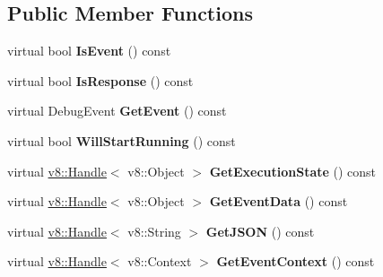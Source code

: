 \subsection*{Public Member Functions}
\begin{DoxyCompactItemize}
\item 
\hypertarget{classv8_1_1internal_1_1_message_impl_abea1e06c7076154a2d84570950d3ee5d}{}virtual bool {\bfseries Is\+Event} () const \label{classv8_1_1internal_1_1_message_impl_abea1e06c7076154a2d84570950d3ee5d}

\item 
\hypertarget{classv8_1_1internal_1_1_message_impl_ad238ccdcd5b57f7ae8a9d606bece6019}{}virtual bool {\bfseries Is\+Response} () const \label{classv8_1_1internal_1_1_message_impl_ad238ccdcd5b57f7ae8a9d606bece6019}

\item 
\hypertarget{classv8_1_1internal_1_1_message_impl_a1a49aa8866053f667b1d2e98c124f0d8}{}virtual Debug\+Event {\bfseries Get\+Event} () const \label{classv8_1_1internal_1_1_message_impl_a1a49aa8866053f667b1d2e98c124f0d8}

\item 
\hypertarget{classv8_1_1internal_1_1_message_impl_a0ab9e3879d700c394048095cfb39caff}{}virtual bool {\bfseries Will\+Start\+Running} () const \label{classv8_1_1internal_1_1_message_impl_a0ab9e3879d700c394048095cfb39caff}

\item 
\hypertarget{classv8_1_1internal_1_1_message_impl_af4143eec72df78d4343252ab2787d66d}{}virtual \hyperlink{classv8_1_1_handle}{v8\+::\+Handle}$<$ v8\+::\+Object $>$ {\bfseries Get\+Execution\+State} () const \label{classv8_1_1internal_1_1_message_impl_af4143eec72df78d4343252ab2787d66d}

\item 
\hypertarget{classv8_1_1internal_1_1_message_impl_a711a397f5e4116aca26cdbcca946652a}{}virtual \hyperlink{classv8_1_1_handle}{v8\+::\+Handle}$<$ v8\+::\+Object $>$ {\bfseries Get\+Event\+Data} () const \label{classv8_1_1internal_1_1_message_impl_a711a397f5e4116aca26cdbcca946652a}

\item 
\hypertarget{classv8_1_1internal_1_1_message_impl_a276d0c496aa70acbd28e049f81214232}{}virtual \hyperlink{classv8_1_1_handle}{v8\+::\+Handle}$<$ v8\+::\+String $>$ {\bfseries Get\+J\+S\+O\+N} () const \label{classv8_1_1internal_1_1_message_impl_a276d0c496aa70acbd28e049f81214232}

\item 
\hypertarget{classv8_1_1internal_1_1_message_impl_a0d31dd63dea9072249fdf6208fad4b71}{}virtual \hyperlink{classv8_1_1_handle}{v8\+::\+Handle}$<$ v8\+::\+Context $>$ {\bfseries Get\+Event\+Context} () const \label{classv8_1_1internal_1_1_message_impl_a0d31dd63dea9072249fdf6208fad4b71}


\end{DoxyCompactItemize}
